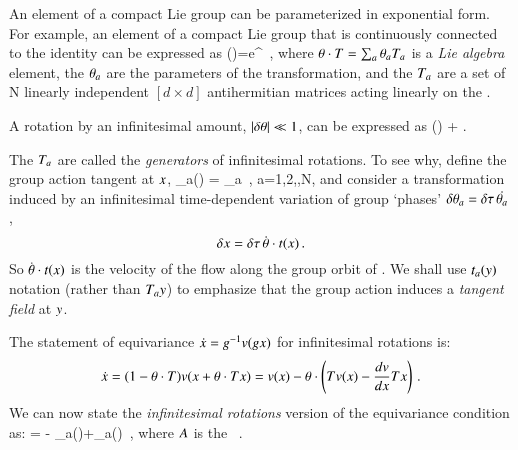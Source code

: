 An element of a compact Lie group can be parameterized in exponential form.
For example,
an element of a compact Lie group that is continuously
connected to the identity can be expressed as
\beq
\LieEl(\gSpace)=e^{{\gSpace} \cdot \Lg }
\,,
where $\gSpace \cdot \Lg = \sum_a \gSpace_a \Lg_a$ is a \emph{Lie algebra} element, the $\gSpace_a$ are the parameters of the transformation, and the $\Lg_a$ are a set of N linearly independent
$[d\times d]$ antihermitian matrices acting linearly on the
{\statesp}.
%

A rotation by an infinitesimal amount, $|\delta \gSpace| \ll 1$, can be  expressed as
\beq
\LieEl(\delta \gSpace)  + \delta \gSpace \cdot \Lg.

The $\Lg_a$  are called the \emph{generators} of infinitesimal rotations. To see why, define the group action tangent at $\ssp$,
\beq
 \groupTan_{a}(\ssp) = \Lg _{a} \ssp
    \,,\qquad
 a=1,2,\cdots,N,
and consider a transformation induced by an infinitesimal
time-dependent variation of group `phases'
$\delta \gSpace_a = \timeStep \, \dot{\gSpace_a}$,
\[
\delta \ssp = \timeStep \, \dot{\gSpace} \cdot \groupTan(\ssp)
\,.
\]
So $\dot{{\bf \theta}} \cdot t(x)$ is the velocity
of the flow along the group orbit of \ssp.
We shall use $t_a(y)$ notation (rather than
$T_{a}y$) to emphasize that the group action
induces a \emph{tangent field} at $y$.

The statement of equivariance
$
\dot{x}=g^{-1} v(g x)
$
for infinitesimal rotations is:
\[
\dot{x}=(1-{\bf \theta} \cdot T ) v(x+{\bf \theta} \cdot T  x)
       =v(x)-{\bf \theta} \cdot \left(
            T v(x) - \frac{dv}{dx} T x
                     \right)
\,.
\]
We can now state the {\em infinitesimal
rotations} version of the equivariance condition
 as:
 = - \groupTan_{a}(\vel)+\Mvar \groupTan_{a}(\ssp)
\,,
\label{eq:InfnmslRot}
\eeq
where $A$ is the \stabmat\ .

